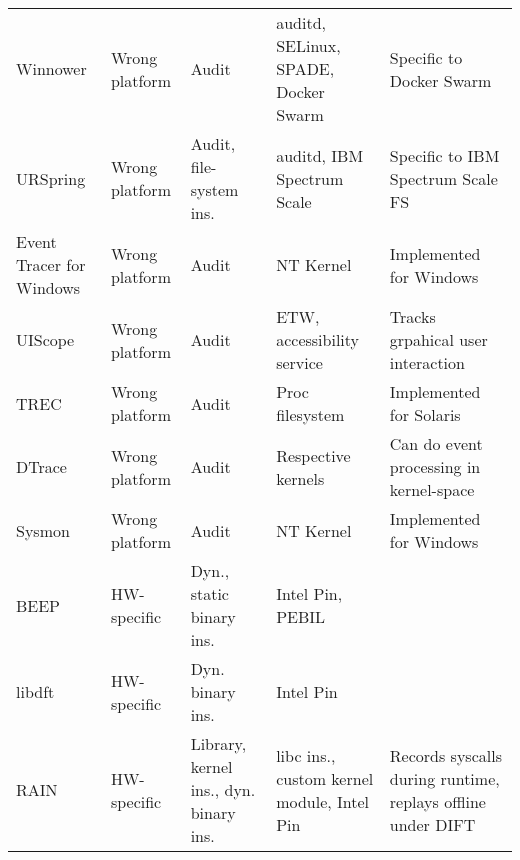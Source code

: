 \begin{table}
{\begin{tabular}{p{}p{}p{}p{}p{}}
Winnower \cite{hassan_towards_2018}                     & Wrong platform   & Audit                                   & auditd, SELinux, SPADE, Docker Swarm          & Specific to Docker Swarm                                      \\
URSpring                                                & Wrong platform   & Audit, file-system ins.                 & auditd, IBM Spectrum Scale                    & Specific to IBM Spectrum Scale FS                             \\
Event Tracer for Windows \cite{noauthor_event_2021}     & Wrong platform   & Audit                                   & NT Kernel                                     & Implemented for Windows                                       \\
UIScope \cite{yang_uiscope_2020}                        & Wrong platform   & Audit                                   & ETW, accessibility service                    & Tracks grpahical user interaction                             \\
TREC \cite{vahdat_transparent_1998}                     & Wrong platform   & Audit                                   & Proc filesystem                               & Implemented for Solaris                                       \\
DTrace \cite{noauthor_about_nodate}                     & Wrong platform   & Audit                                   & Respective kernels                            & Can do event processing in kernel-space                       \\
Sysmon \cite{markruss_sysmon_2023}                      & Wrong platform   & Audit                                   & NT Kernel                                     & Implemented for Windows                                       \\
BEEP \cite{lee_high_2017}                               & HW-specific      & Dyn., static binary ins.                & Intel Pin, PEBIL                              &                                                               \\
libdft \cite{kemerlis_libdft_2012}                      & HW-specific      & Dyn. binary ins.                        & Intel Pin                                     &                                                               \\
RAIN \cite{ji_rain_2017}                                & HW-specific      & Library, kernel ins., dyn. binary ins.  & libc ins., custom kernel module, Intel Pin    & Records syscalls during runtime, replays offline under DIFT   \\

\end{tabular}}
\end{table}
